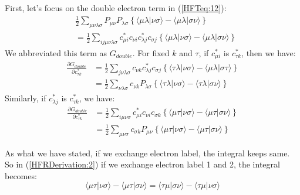 First, let's focus on the double electron term in (\ref{HFTeq:12}):
\begin{align}
& \frac{1}{2}\sum_{\mu \nu \lambda\sigma}P_{\mu\nu}P_{\lambda\sigma}
    \left \{ \langle\mu\lambda|\nu\sigma\rangle -
\langle\mu\lambda|\sigma\nu\rangle
    \right \}  \nonumber \\
& = \frac{1}{2}\sum_{ij\mu \nu \lambda\sigma}c^{*}_{\mu i}c_{\nu
i}c^{*}_{\lambda j}c_{\sigma j}
    \left \{ \langle\mu\lambda|\nu\sigma\rangle -
\langle\mu\lambda|\sigma\nu\rangle
    \right \}
\end{align}
We abbreviated this term as $G_{double}$. For fixed $k$ and $\tau$, if
$c^{*}_{\mu i}$ is $c^{*}_{\tau k}$, then we have:
\begin{align}\label{HFRDerivation:1}
  \frac{\partial G_{double}}{\partial c^{*}_{\tau k}} &=
 \frac{1}{2}\sum_{j\nu \lambda\sigma}c_{\nu
k}c^{*}_{\lambda j}c_{\sigma j}
    \left \{ \langle\tau\lambda|\nu\sigma\rangle -
\langle\mu\lambda|\sigma\tau\rangle
    \right \} \nonumber \\
&=  \frac{1}{2}\sum_{\nu \lambda\sigma}c_{\nu
k}P_{\lambda\sigma}
    \left \{ \langle\tau\lambda|\nu\sigma\rangle -
\langle\tau\lambda|\sigma\nu\rangle
    \right \}
\end{align}
Similarly, if $c^{*}_{\lambda j}$ is $c^{*}_{\tau k}$, we have:
\begin{align}\label{HFRDerivation:2}
  \frac{\partial G_{double}}{\partial c^{*}_{\tau k}} &=
 \frac{1}{2}\sum_{i\mu\nu \sigma}c^{*}_{\mu i}c_{\nu
i}c_{\sigma k}
    \left \{ \langle\mu\tau|\nu\sigma\rangle -
\langle\mu\tau|\sigma\nu\rangle
    \right \} \nonumber \\
&=  \frac{1}{2}\sum_{\mu\nu\sigma}c_{\sigma
k}P_{\mu\nu}
    \left \{ \langle\mu\tau|\nu\sigma\rangle -
\langle\mu\tau|\sigma\nu\rangle
    \right \}
\end{align}

As what we have stated, if we exchange electron label, the integral keeps same.
So in (\ref{HFRDerivation:2}) if we exchange electron label 1 and 2, the
integral becomes:
\begin{equation}\label{HFRDerivation:3}
 \langle\mu\tau|\nu\sigma\rangle -
\langle\mu\tau|\sigma\nu\rangle = \langle\tau\mu|\sigma\nu\rangle -
\langle\tau\mu|\nu\sigma\rangle
\end{equation}

